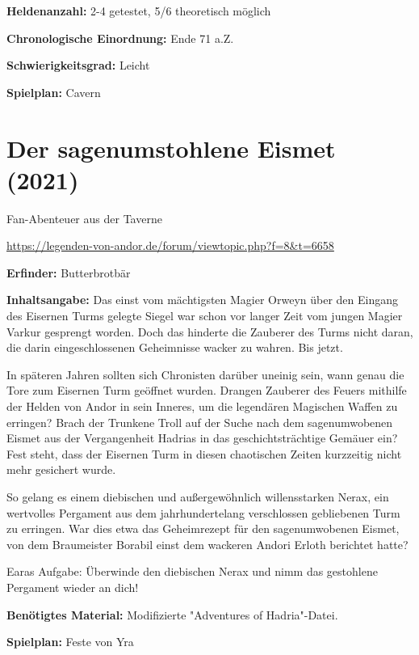 {\textbf{Heldenanzahl:} 2-4 getestet, 5/6 theoretisch möglich

\textbf{Chronologische Einordnung:} Ende 71 a.Z.

\textbf{Schwierigkeitsgrad:} Leicht

\textbf{Spielplan:} Cavern



\newpage
{}
\section{Der sagenumstohlene Eismet (2021)}

\begin{center}
    Fan-Abenteuer aus der Taverne

    \url{https://legenden-von-andor.de/forum/viewtopic.php?f=8&t=6658}
\end{center}



\textbf{Erfinder:} Butterbrotbär

\textbf{Inhaltsangabe:} Das einst vom mächtigsten Magier Orweyn über den Eingang des Eisernen Turms gelegte Siegel war schon vor langer Zeit vom jungen Magier Varkur gesprengt worden. Doch das hinderte die Zauberer des Turms nicht daran, die darin eingeschlossenen Geheimnisse wacker zu wahren. Bis jetzt.

In späteren Jahren sollten sich Chronisten darüber uneinig sein, wann genau die Tore zum Eisernen Turm geöffnet wurden. Drangen Zauberer des Feuers mithilfe der Helden von Andor in sein Inneres, um die legendären Magischen Waffen zu erringen? Brach der Trunkene Troll auf der Suche nach dem sagenumwobenen Eismet aus der Vergangenheit Hadrias in das geschichtsträchtige Gemäuer ein? Fest steht, dass der Eisernen Turm in diesen chaotischen Zeiten kurzzeitig nicht mehr gesichert wurde.

So gelang es einem diebischen und außergewöhnlich willensstarken Nerax, ein wertvolles Pergament aus dem jahrhundertelang verschlossen gebliebenen Turm zu erringen. War dies etwa das Geheimrezept für den sagenumwobenen Eismet, von dem Braumeister Borabil einst dem wackeren Andori Erloth berichtet hatte?

Earas Aufgabe: Überwinde den diebischen Nerax und nimm das gestohlene Pergament wieder an dich!


\textbf{Benötigtes Material:} Modifizierte "Adventures of Hadria"-Datei.

\textbf{Spielplan:} Feste von Yra

}
